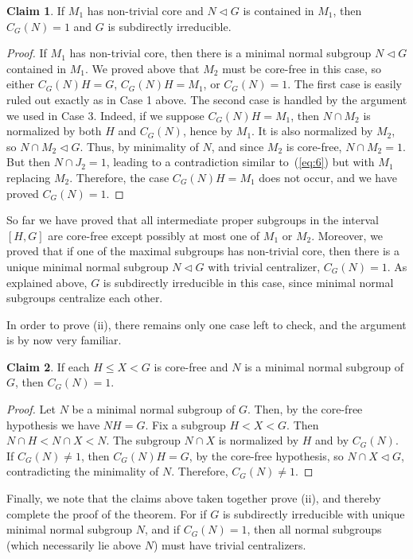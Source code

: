 \documentclass[cm,dissertation,actual,final]{uhthesis}
\theoremstyle{plain}
\theoremstyle{definition}
\newcounter{claim}
\newtheorem{claim}[claim]{Claim}
\theoremstyle{remark}
\numberwithin{theorem}{section}
\numberwithin{claim}{chapter}
\numberwithin{equation}{section}
\numberwithin{conjecture}{chapter}
\newcommand{\<}{\ensuremath{\langle}}
\renewcommand{\>}{\ensuremath{\rangle}}
\renewcommand{\leq}{\ensuremath{\leqslant}}
\newcommand{\ssubnormal}{\ensuremath{\vartriangleleft}}
\newcommand{\0}{\ensuremath{\mathbf{0}}}
\newcommand{\1}{\ensuremath{\mathbf{1}}}
\newcommand{\2}{\ensuremath{\mathbf{2}}}
\newcommand{\3}{\ensuremath{\mathbf{3}}}
\newcommand{\4}{\ensuremath{\mathbf{4}}}
\newcommand{\5}{\ensuremath{\mathbf{5}}}
\begin{document}
\begin{claim}
If $M_1$ has non-trivial core
  and $N\ssubnormal G$ is contained in $M_1$, then
  $C_G(N)=1$ and $G$ is subdirectly irreducible.
\end{claim}
\begin{proof}
If $M_1$ has non-trivial core, then there is a minimal normal
subgroup $N\ssubnormal G$ contained in $M_1$.  We proved above that
$M_2$ must be core-free in this case, so either $C_G(N)H  = G$, 
$C_G(N)H  = M_1$, 
or $C_G(N)=1$.  The first case is easily ruled out exactly as in Case 1 above. 
The second case is handled by the argument we used in Case 3.  Indeed, if we suppose 
$C_G(N)H = M_1$, 
then 
$N\cap M_2$ 
is normalized by both $H$ and $C_G(N)$, hence by
$M_1$.  It is also normalized by $M_2$, so 
$N\cap M_2\ssubnormal G$.  Thus, by minimality of $N$, 
and since $M_2$ is core-free,
$N\cap M_2 = 1$.  But then $N\cap J_2 = 1$,
leading to a contradiction similar to~(\ref{eq:6}) but with $M_1$ replacing $M_2$.  
Therefore, the case 
$C_G(N)H = M_1$ does not occur, and we have proved $C_G(N)=1$. 
\end{proof}


So far we have proved that all intermediate proper subgroups in the interval $[H, G]$
are core-free except possibly at most one of $M_1$ or $M_2$.  Moreover, we
proved that if one of the maximal subgroups has non-trivial core, then there is
a unique minimal normal subgroup $N\ssubnormal G$ with trivial centralizer,
$C_G(N) = 1$.  As explained above, $G$ is subdirectly irreducible in this case,
since minimal normal subgroups centralize each other.

In order to prove (ii), there remains only one case left to check, and the
argument is by now very familiar.
\begin{claim}
  If each $H\leq X < G$ is core-free and $N$ is a minimal normal subgroup of
  $G$, then $C_G(N) = 1$.
\end{claim}
\begin{proof}
  Let $N$ be a minimal normal subgroup of $G$. Then, by the core-free hypothesis
  we have $NH = G$. Fix a subgroup $H< X < G$.  Then $N\cap H < N\cap X < N$.
  The subgroup $N\cap X$ is normalized by $H$ and by 
  $C_G(N)$.  If $C_G(N) \neq 1$, then $C_G(N)H = G$, by the core-free
  hypothesis, so $N\cap X\ssubnormal G$, contradicting the minimality of $N$.  
  Therefore, $C_G(N) \neq 1$.
\end{proof}
Finally, we note that the claims above taken together prove (ii), and thereby
complete the proof of the theorem.  For if $G$ is subdirectly irreducible with
unique minimal normal subgroup $N$, and if $C_G(N) = 1$, then all normal
subgroups (which necessarily lie above $N$) must have trivial centralizers. 
\end{document}
